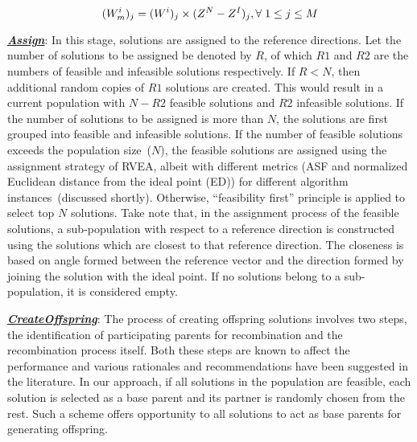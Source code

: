 \begin{equation}\footnotesize
(W^i_m)_j = (W^i)_j\times(Z^N - Z^I)_j, \forall~1\le j\le M
\label{eqn:KHTEqn:3}
\end{equation}

\noindent \underline{\it \textbf{Assign}}: In this stage, solutions are assigned to the reference directions. Let the number of solutions to be assigned be denoted by $R$, of which $R1$ and $R2$ are the numbers of feasible and infeasible solutions respectively. If $R < N$, then additional random copies of $R1$ solutions are created. This would result in a current population with $N-R2$ feasible solutions and $R2$ infeasible solutions. If the number of solutions to be assigned is more than $N$, the solutions are first grouped into feasible and infeasible solutions. If the number of feasible solutions exceeds the population size~($N$), the feasible solutions are assigned using the assignment strategy of RVEA, albeit with different metrics (ASF and normalized Euclidean distance from the ideal point (ED)) for different algorithm instances~(discussed shortly). Otherwise, ``feasibility first'' principle is applied to select top $N$ solutions. Take note that, in the assignment process of the feasible solutions, a sub-population with respect to a reference direction is constructed using the solutions which are closest to that reference direction. The closeness is based on angle formed between the reference vector and the direction formed by joining the solution with the ideal point. If no solutions belong to a sub-population, it is considered empty. 

\noindent \underline{\it \textbf{CreateOffspring}}: The process of creating offspring solutions involves two steps, the identification of participating parents for recombination and the recombination process itself. Both these steps are known to affect the performance and various rationales and recommendations have been suggested in the literature. In our approach, if all solutions in the population are feasible, each solution is selected as a base parent and its partner is randomly chosen from the rest. Such a scheme offers opportunity to all solutions to act as base parents for generating offspring.

